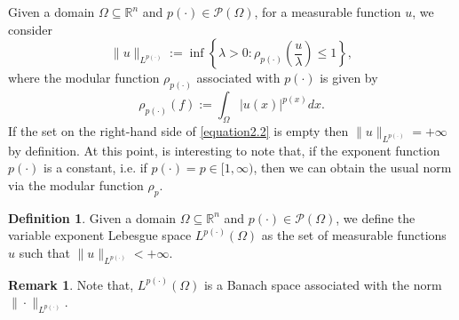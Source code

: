 \documentclass[a4paper,12pt]{amsart}
\theoremstyle{definition}
\newtheorem{definition}{Definition}[section]
\newtheorem{remark}{Remark}[section]
\theoremstyle{plain}
\begin{document}
Given a domain $\Omega\subseteq\mathbb{R}^{n}$ and $p(\cdot)\in \mathcal{P}(\Omega)$, for a measurable function $u$, we consider 
\begin{equation}\label{equation2.2}
   \|u\|_{L^{p(\cdot)}}:=\inf\left\{\lambda>0:  \rho_{p(\cdot)}\left(\frac{u}{\lambda}\right)\leq 1\right\},
\end{equation}
where the modular function $\rho_{p(\cdot)}$ associated with $p(\cdot)$ is given by 
\begin{equation*}
   \rho_{p(\cdot)}(f):=
   \int_\Omega|u(x)|^{p(x)}dx.
\end{equation*}
If the set on the right-hand side of  \eqref{equation2.2} is empty then $\|u\|_{L^{p(\cdot)}} = +\infty$ by definition.
At this point, is interesting to note that,  if the exponent function $p(\cdot)$ is a constant, i.e. if $p(\cdot)=p\in [1,\infty)$, then we can obtain the usual norm  via the modular function $ \rho_{p}$.
\smallbreak

\begin{definition}\label{de2.2}
Given a domain $\Omega\subseteq\mathbb{R}^{n}$ and $p(\cdot)\in \mathcal{P}(\Omega)$, we define the variable exponent Lebesgue space $L^{p(\cdot)}(\Omega)$ as the set of   measurable functions $u$ such that   $\|u\|_{L^{p(\cdot)}}<+\infty$.
\end{definition}

\begin{remark}
Note that, $L^{p(\cdot)}(\Omega)$ is a Banach space associated with the norm $\|\cdot\|_{L^{p(\cdot)}}$.
\end{remark}
\end{document}
